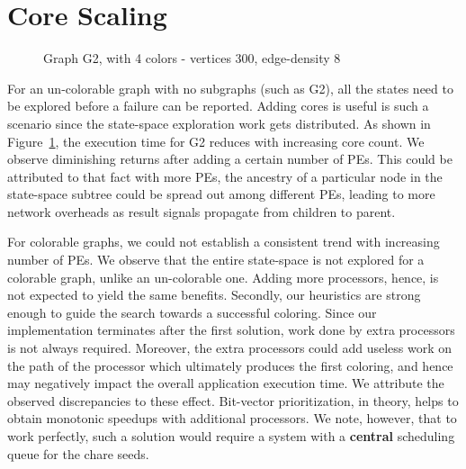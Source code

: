 \documentclass[10pt,oneside]{article}
\begin{document}
\section{Core Scaling}

\begin{figure}
\centering
\caption{Graph G2, with 4 colors - vertices 300, edge-density 8  }
\label{fig_core_scale}
\end{figure}            

  For an  un-colorable graph with no subgraphs (such as G2), all the states need to be 
  explored before a failure can be reported. Adding cores is useful is such a scenario since
  the state-space exploration work gets distributed. As shown in Figure~\ref{fig_core_scale}, 
  the execution time for G2 reduces with increasing core count. We observe diminishing returns
  after adding a certain number of PEs. This could be attributed to that fact with more PEs, the ancestry
  of a particular node in the state-space subtree could be spread out among different PEs, leading to 
  more network overheads as result signals propagate from children to parent.
  
  For colorable graphs, we could not establish a consistent trend with increasing number of PEs. We observe
  that the entire state-space is not explored for a colorable graph, unlike an un-colorable one. Adding more 
  processors, hence, is not expected to yield the same benefits. Secondly, our heuristics are strong enough to guide 
  the search towards a successful coloring. Since our implementation terminates after the first solution, work done by
  extra processors is not always required. Moreover, the extra processors could add useless work on the path of 
  the processor which ultimately produces the first coloring, and hence may negatively impact the overall application
  execution time. We attribute the observed discrepancies to these effect. Bit-vector prioritization, in theory, helps to 
  obtain monotonic speedups with additional processors. We note, however, that to work perfectly, such a solution 
  would require a system with a \textbf{central} scheduling queue for the chare seeds. 
\end{document}
